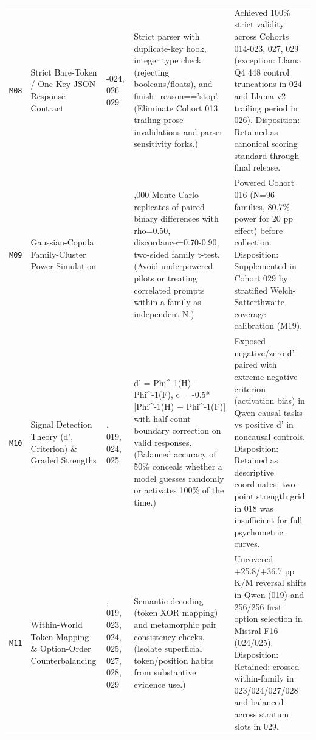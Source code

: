 {\begin{longtable}{@{}>{\raggedright\arraybackslash}p{0.9cm}>{\raggedright\arraybackslash}p{2.7cm}>{\raggedright\arraybackslash}p{1.7cm}>{\raggedright\arraybackslash}p{4.4cm}>{\raggedright\arraybackslash}p{4.7cm}@{}}
\texttt{M08} & Strict Bare-\allowbreak{}Token /\allowbreak{} One-\allowbreak{}Key JSON Response Contract & 014-\allowbreak{}024, 026-\allowbreak{}029 & Strict parser with duplicate-\allowbreak{}key hook, integer type check (rejecting booleans/\allowbreak{}floats), and finish\_reason=='stop'. (Eliminate Cohort 013 trailing-\allowbreak{}prose invalidations and parser sensitivity forks.) & Achieved 100\% strict validity across Cohorts 014-\allowbreak{}023, 027, 029 (exception: Llama Q4 448 control truncations in 024 and Llama v2 trailing period in 026). Disposition: Retained as canonical scoring standard through final release. \\[2pt]
\texttt{M09} & Gaussian-\allowbreak{}Copula Family-\allowbreak{}Cluster Power Simulation & 016 & 100,000 Monte Carlo replicates of paired binary differences with rho=0.50, discordance=0.70-\allowbreak{}0.90, two-\allowbreak{}sided family t-\allowbreak{}test. (Avoid underpowered pilots or treating correlated prompts within a family as independent N.) & Powered Cohort 016 (N=96 families, 80.7\% power for 20 pp effect) before collection. Disposition: Supplemented in Cohort 029 by stratified Welch-\allowbreak{}Satterthwaite coverage calibration (M19). \\[2pt]
\texttt{M10} & Signal Detection Theory (d', Criterion) \& Graded Strengths & 018, 019, 024, 025 & d' = Phi\textasciicircum{}-\allowbreak{}1(H) -\allowbreak{} Phi\textasciicircum{}-\allowbreak{}1(F), c = -\allowbreak{}0.5*[Phi\textasciicircum{}-\allowbreak{}1(H) + Phi\textasciicircum{}-\allowbreak{}1(F)] with half-\allowbreak{}count boundary correction on valid responses. (Balanced accuracy of 50\% conceals whether a model guesses randomly or activates 100\% of the time.) & Exposed negative/\allowbreak{}zero d' paired with extreme negative criterion (activation bias) in Qwen causal tasks vs positive d' in noncausal controls. Disposition: Retained as descriptive coordinates; two-\allowbreak{}point strength grid in 018 was insufficient for full psychometric curves. \\[2pt]
\texttt{M11} & Within-\allowbreak{}World Token-\allowbreak{}Mapping \& Option-\allowbreak{}Order Counterbalancing & 018, 019, 023, 024, 025, 027, 028, 029 & Semantic decoding (token XOR mapping) and metamorphic pair consistency checks. (Isolate superficial token/\allowbreak{}position habits from substantive evidence use.) & Uncovered +25.8/\allowbreak{}+36.7 pp K/\allowbreak{}M reversal shifts in Qwen (019) and 256/\allowbreak{}256 first-\allowbreak{}option selection in Mistral F16 (024/\allowbreak{}025). Disposition: Retained; crossed within-\allowbreak{}family in 023/\allowbreak{}024/\allowbreak{}027/\allowbreak{}028 and balanced across stratum slots in 029. \\[2pt]

\end{longtable}}
